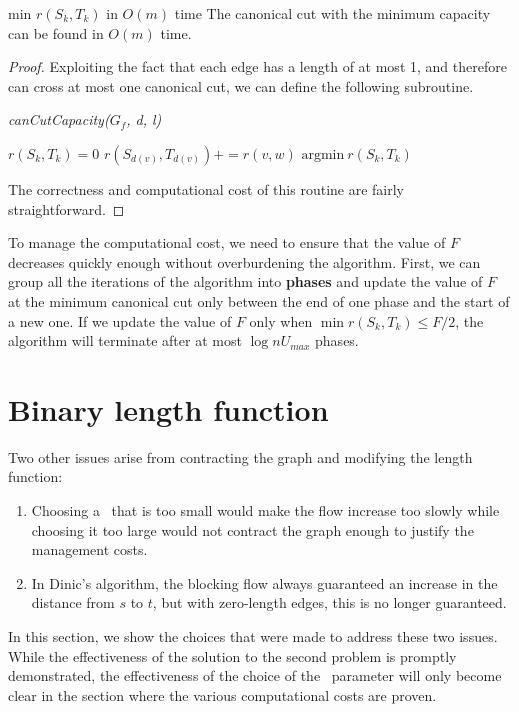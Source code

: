     \begin{lemma}{min $r(S_k,T_k)$ in $O(m)$ time}{}
        The canonical cut with the minimum capacity can be found in $O(m)$ time.
    \end{lemma}
    \begin{proof}

        Exploiting the fact that each edge has a length of at most 1, and therefore can cross at most one canonical cut, we can define the following subroutine.
        \begin{algorithm}[H]
            \caption{\textit{canCutCapacity($G_f$, d, l)}}
            \label{canCutCapacity}
            \begin{algorithmic}[1]
                  $r(S_k,T_k) = 0$
                \EndFor
                   $r(S_{d(v)},T_{d(v)}) += r(v,w)$\EndIf
                \EndFor
                \State\Return  $\text{argmin}\ r(S_k,T_k)$
            \end{algorithmic}
        \end{algorithm}
    The correctness and computational cost of this routine are fairly straightforward.
    \end{proof}

    To manage the computational cost, we need to ensure that the value of $F$ decreases quickly enough without overburdening the algorithm.  
    First, we can group all the iterations of the algorithm into \textbf{phases} and update the value of $F$ at the minimum canonical cut only between the end of one phase and the start of a new one. If we update the value of $F$ only when $\min r(S_k, T_k) \leq F/2$, the algorithm will terminate after at most $\log nU_{max}$ phases.

\section{Binary length function}
Two other issues arise from contracting the graph and modifying the length function:
\begin{enumerate}
    \item Choosing a \dlt\ that is too small would make the flow increase too slowly while choosing it too large would not contract the graph enough to justify the management costs.
    \item In Dinic's algorithm, the blocking flow always guaranteed an increase in the distance from $s$ to $t$, but with zero-length edges, this is no longer guaranteed.

\end{enumerate}
In this section, we show the choices that were made to address these two issues. While the effectiveness of the solution to the second problem is promptly demonstrated, the effectiveness of the choice of the \dlt\  parameter will only become clear in the section where the various computational costs are proven.

